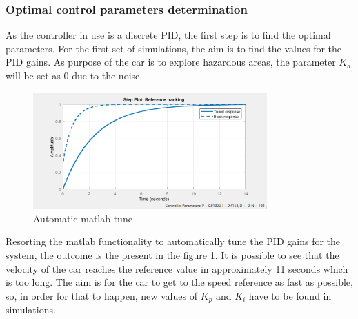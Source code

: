 \subsubsection{Optimal control parameters determination}
As the controller in use is a discrete PID, the first step is to find the optimal parameters.
For the first set of simulations, the aim is to find the values for the PID gains. As purpose of the car is to explore hazardous areas, the parameter $K_d$ will be set as 0 due to the noise. \\
\begin{figure}[!h]
\centering
\includegraphics[width=0.8\textwidth]{./img/pidtuned.png}
\caption {\label{fig:pid1-tuned}Automatic matlab tune}
\end{figure}
Resorting the matlab functionality to automatically tune the PID gains for the system, the outcome is the present in the figure \ref{fig:pid1-tuned}. It is possible to see that the velocity of the car reaches the reference value in approximately 11 seconds which is too long. The aim is for the car to get to the speed reference as fast as possible, so, in order for that to happen, new values of $K_p$ and $K_i$ have to be found in simulations.\

